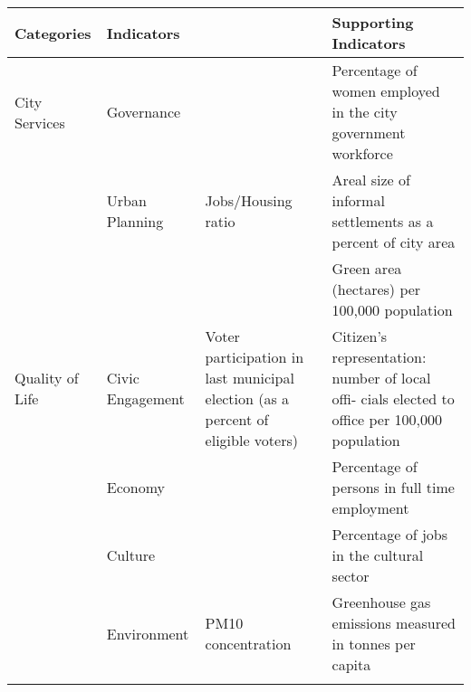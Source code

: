 \begin{landscape}
\begin{table}[th]
\begin{center}
\begin{tabular}{ >{\raggedright\arraybackslash}p{} >{\raggedright\arraybackslash}p{} >{\raggedright\arraybackslash}p{} >{\raggedright\arraybackslash}p{} } 
\hline
Categories & Indicators &  & Supporting Indicators \\
\hline
City Services & Governance &  & Percentage of women employed in the city government workforce \linebreak \\
  & Urban Planning & Jobs/Housing ratio & Areal size of informal settlements as a percent of city area \\
  &  &  & Green area (hectares) per 100,000 population \linebreak \\
Quality of Life & Civic Engagement & Voter participation in last municipal election (as a percent of eligible voters) & Citizen’s representation: number of local offi- cials elected to office per 100,000 population \linebreak \\
  & Economy &  & Percentage of persons in full time employment \linebreak \\
  & Culture &  & Percentage of jobs in the cultural sector \linebreak \\
  & Environment & PM10 concentration & Greenhouse gas emissions measured in tonnes per capita \\
\hline
\label{tbl:globalCityIndicatorsFacility4}
\end{tabular}
\end{center}
\end{table}


\end{landscape}
